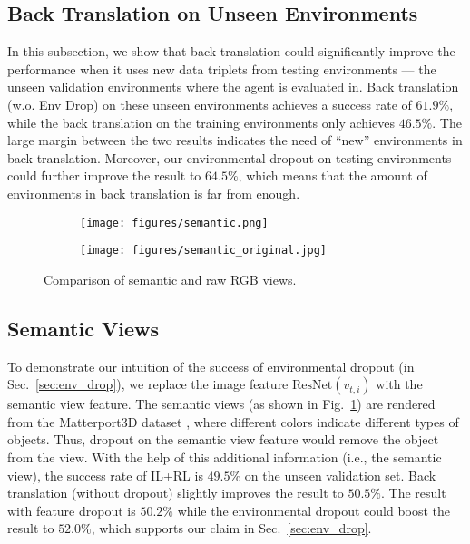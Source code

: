 \documentclass[11pt,a4paper]{article}
\begin{document}
\subsection{Back Translation on Unseen Environments}
\label{sec:sufficient}
In this subsection, we show that back translation could significantly improve the performance when it uses new data triplets from testing environments --- the unseen validation environments where the agent is evaluated in.
Back translation (w.o. Env Drop) on these unseen environments achieves a success rate of $61.9\%$, while the back translation on the training environments only achieves $46.5\%$.
The large margin between the two results indicates the need of ``new'' environments in back translation.
Moreover, our environmental dropout on testing environments could further improve the result to $64.5\%$, which means that the amount of environments in back translation is far from enough.

\begin{figure}[t!]
    \centering
    \begin{subfigure}[t]{0.24\textwidth}
        \centering
        \texttt{[image: figures/semantic.png]}
    \end{subfigure}\begin{subfigure}[t]{0.24\textwidth}
        \centering
        \texttt{[image: figures/semantic\_original.jpg]}
    \end{subfigure}
    \vspace{1pt}
    \caption{Comparison of semantic and raw RGB views.
}
    \label{fig:sem_view}
    \vspace{-6pt}
\end{figure}
\subsection{Semantic Views}
\label{sec:feature_analysis}
To demonstrate our intuition of the success of environmental dropout (in Sec.~\ref{sec:env_drop}), we replace the image feature $\mathrm{ResNet}(v_{t,i})$ with the semantic view feature.
The semantic views (as shown in Fig.~\ref{fig:sem_view}) are rendered from the Matterport3D dataset \cite{Matterport3D}, where different colors indicate different types of objects.
Thus, dropout on the semantic view feature would remove the object from the view.
With the help of this additional information (i.e., the semantic view), the success rate of IL+RL is $49.5\%$ on the unseen validation set.
Back translation (without dropout) slightly improves the result to $50.5\%$.
The result with feature dropout is $50.2\%$ while the environmental dropout could boost the result to $52.0\%$, which supports our claim in Sec.~\ref{sec:env_drop}.
 
\end{document}
